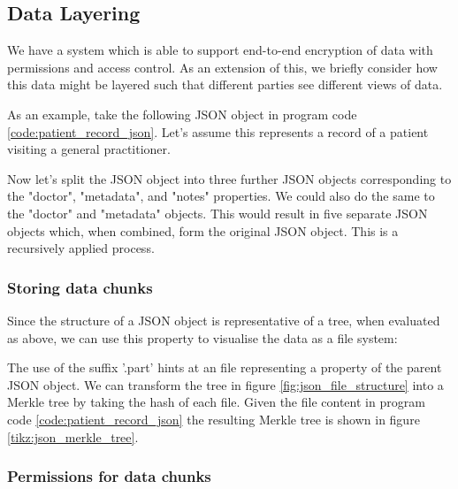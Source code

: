 \subsection{Data Layering}

We have a system which is able to support end-to-end encryption of data with permissions and access control. As an extension of this, we briefly consider how this data might be layered such that different parties see different views of data.

As an example, take the following JSON object in program code \ref{code:patient_record_json}. Let's assume this represents a record of a patient visiting a general practitioner.



Now let's split the JSON object into three further JSON objects corresponding to the "doctor", "metadata", and "notes" properties. We could also do the same to the "doctor" and "metadata" objects. This would result in five separate JSON objects which, when combined, form the original JSON object. This is a recursively applied process.

\subsubsection{Storing data chunks}

Since the structure of a JSON object is representative of a tree, when evaluated as above, we can use this property to visualise the data as a file system:



The use of the suffix '.part' hints at an file representing a property of the parent JSON object. We can transform the tree in figure \ref{fig:json_file_structure} into a Merkle tree by taking the hash of each file. Given the file content in program code \ref{code:patient_record_json} the resulting Merkle tree is shown in figure \ref{tikz:json_merkle_tree}.



\subsubsection{Permissions for data chunks}
